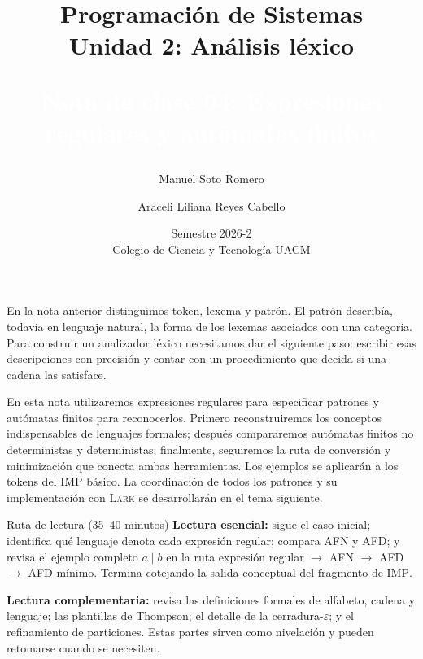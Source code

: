 \documentclass[11pt,spanish]{article}
\newcommand{\cf}[2]{%
    \colorbox{#1}{\textcolor{white}{\strut #2}}%
}
\begin{document}

\title{Programación de Sistemas\\
Unidad 2: Análisis léxico\\ \bigskip
\cf{rojo7a3c3d}{\textbf{\Large Nota de clase 04: Expresiones regulares y autómatas finitos}}}
\author{Manuel Soto Romero \and Araceli Liliana Reyes Cabello}
\date{Semestre 2026-2 \\ Colegio de Ciencia y Tecnología UACM}

\maketitle
\renewcommand*{\thefootnote}{\arabic{footnote}}
\setcounter{footnote}{0}

En la nota anterior distinguimos token, lexema y patrón. El patrón describía, todavía en lenguaje natural, la forma de los lexemas asociados con una categoría. Para construir un analizador léxico necesitamos dar el siguiente paso: escribir esas descripciones con precisión y contar con un procedimiento que decida si una cadena las satisface.

En esta nota utilizaremos expresiones regulares para especificar patrones y autómatas finitos para reconocerlos. Primero reconstruiremos los conceptos indispensables de lenguajes formales; después compararemos autómatas finitos no deterministas y deterministas; finalmente, seguiremos la ruta de conversión y minimización que conecta ambas herramientas. Los ejemplos se aplicarán a los tokens del \textsc{IMP} básico. La coordinación de todos los patrones y su implementación con \textsc{Lark} se desarrollarán en el tema siguiente.

\begin{ruta}{Ruta de lectura (35--40 minutos)}
\textbf{Lectura esencial:} sigue el caso inicial; identifica qué lenguaje denota cada expresión regular; compara AFN y AFD; y revisa el ejemplo completo \(a\mid b\) en la ruta expresión regular \(\rightarrow\) AFN \(\rightarrow\) AFD \(\rightarrow\) AFD mínimo. Termina cotejando la salida conceptual del fragmento de \textsc{IMP}.

\textbf{Lectura complementaria:} revisa las definiciones formales de alfabeto, cadena y lenguaje; las plantillas de Thompson; el detalle de la cerradura-\(\varepsilon\); y el refinamiento de particiones. Estas partes sirven como nivelación y pueden retomarse cuando se necesiten.
\end{ruta}
\end{document}
